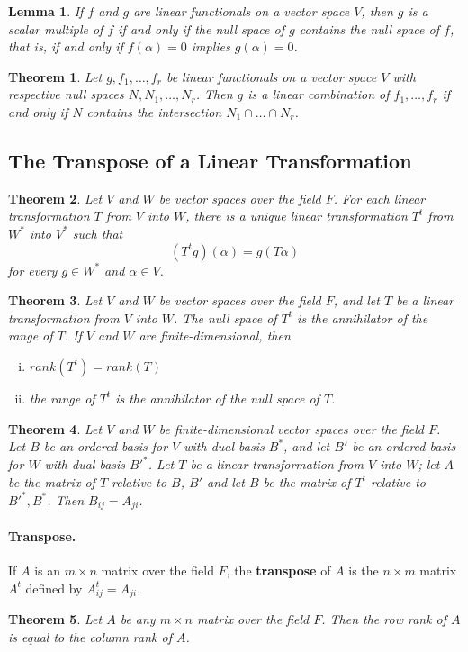 \documentclass{article}
\newtheorem{theorem}{Theorem}[section]
\newtheorem*{lemma*}{Lemma}
\begin{document}
\begin{lemma*}
  If $f$ and $g$ are linear functionals on a vector space $V$, then $g$ is a
  scalar multiple of $f$ if and only if the null space of $g$ contains the null
  space of $f$, that is, if and only if $f(\alpha) = 0$ implies $g(\alpha) = 0$.
\end{lemma*}

\begin{theorem}
  Let $g, f_1, \ldots, f_r$ be linear functionals on a vector space $V$ with
  respective null spaces $N, N_1, \ldots, N_r$. Then $g$ is a linear combination
  of $f_1, \ldots, f_r$ if and only if $N$ contains the intersection $N_1 \cap
  \ldots \cap N_r$.
\end{theorem}

\subsection{The Transpose of a Linear Transformation}

\begin{theorem}
  Let $V$ and $W$ be vector spaces over the field $F$. For each linear
  transformation $T$ from $V$ into $W$, there is a unique linear transformation
  $T^t$ from $W^*$ into $V^*$ such that \[
    (T^tg)(\alpha) = g(T\alpha)
  \] for every $g \in W^*$ and $\alpha \in V$.
\end{theorem}

\begin{theorem}
  Let $V$ and $W$ be vector spaces over the field $F$, and let $T$ be a linear
  transformation from $V$ into $W$. The null space of $T^t$ is the annihilator of the range of $T$. If $V$ and $W$ are finite-dimensional, then
  \begin{enumerate}[(i)]
    \item $rank(T^t) = rank(T)$
    \item the range of $T^t$ is the annihilator of the null space of $T$.
  \end{enumerate}
\end{theorem}

\begin{theorem}
  Let $V$ and $W$ be finite-dimensional vector spaces over the field $F$. Let
  $B$ be an ordered basis for $V$ with dual basis $B^*$, and let $B'$ be an
  ordered basis for $W$ with dual basis $B'^*$. Let $T$ be a linear
  transformation from $V$ into $W$; let $A$ be the matrix of $T$ relative to
  $B$, $B'$ and let $B$ be the matrix of $T^t$ relative to $B'^*, B^*$. Then
  $B_{ij} = A_{ji}$.
\end{theorem}

\paragraph{Transpose.} If $A$ is an $m \times n$ matrix over the field $F$, the
\textbf{transpose} of $A$ is the $n \times m$ matrix $A^t$ defined by
$A^t_{ij} = A_{ji}$.

\begin{theorem}
  Let $A$ be any $m \times n$ matrix over the field $F$. Then the row rank of
  $A$ is equal to the column rank of $A$.
\end{theorem}
\end{document}
